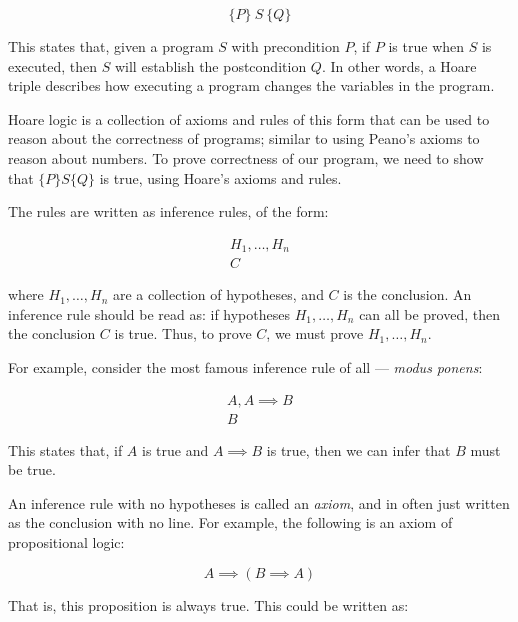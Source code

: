 \begin{displaymath}
  \{P\}\ S\ \{Q\}
\end{displaymath}

This states that, given a program \(S\) with precondition \(P\), if \(P\) is true when \(S\) is executed, then \(S\) will establish the postcondition \(Q\). In other words, a Hoare triple describes how executing a program changes the variables in the program.

Hoare logic is a collection of axioms and rules of this form that can be used to reason about the correctness of programs; similar to using Peano's axioms to reason about numbers. To prove correctness of our program, we need to show that \(\{P\} S \{Q\}\) is true, using Hoare's axioms and rules.

The rules are written as inference rules, of the form:

\begin{displaymath}
 \begin{array}{c}
  H_1, \ldots, H_n\\
 \hline
  C
 \end{array}
\end{displaymath}

where $H_1, \ldots, H_n$ are a collection of hypotheses, and $C$ is the conclusion. An inference rule should be read as: if hypotheses $H_1, \ldots, H_n$ can all be proved, then the conclusion $C$ is true. Thus, to prove $C$, we must prove $H_1, \ldots, H_n$.

For example, consider the most famous inference rule of all --- \emph{modus ponens}:

\begin{displaymath}
 \begin{array}{c}
  A, A \implies B\\
 \hline
  B
 \end{array}
\end{displaymath}

This states that, if $A$ is true and $A \implies B$ is true, then we can infer that $B$ must be true.

An inference rule with no hypotheses is called an \emph{axiom}, and in often just written as the conclusion with no line. For example, the following is an axiom of propositional logic:

\begin{displaymath}
 A \implies (B \implies A)
\end{displaymath}

That is, this proposition is always true. This could be written as:


